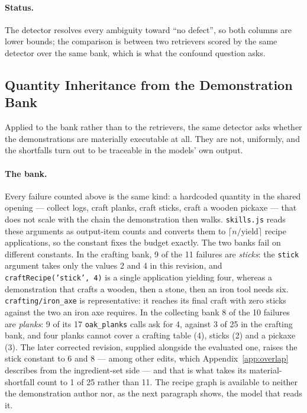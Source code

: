 \documentclass[letterpaper]{article} %
\newcommand{\appref}[1]{Appendix~\ref{#1}}
\begin{document}
\paragraph{Status.}  The detector resolves every
ambiguity toward ``no defect'', so both columns are lower bounds; the
comparison is between two retrievers scored by the same detector over
the same bank, which is what the confound question asks.

\subsection*{Quantity Inheritance from the Demonstration Bank}
\label{app:quantity}

Applied to the bank rather than to the retrievers, the same detector
asks whether the demonstrations are materially executable at all.  They
are not, uniformly, and the shortfalls turn out to be traceable in the
models' own output.

\paragraph{The bank.}  Every failure counted above is the same kind: a
hardcoded quantity in the shared opening --- collect logs, craft planks,
craft sticks, craft a wooden pickaxe --- that does not scale with the
chain the demonstration then walks.  \texttt{skills.js} reads these
arguments as output-item counts and converts them to
$\lceil n/\text{yield}\rceil$ recipe applications, so the constant fixes
the budget exactly.  The two banks fail on different constants.  In the
crafting bank, 9 of the 11 failures are \emph{sticks}: the
\texttt{stick} argument takes only the values 2 and 4 in this revision,
and \texttt{craftRecipe('stick', 4)} is a single application yielding
four, whereas a demonstration that crafts a wooden, then a stone, then
an iron tool needs six.  \texttt{crafting/iron\_axe} is representative:
it reaches its final craft with zero sticks against the two an iron axe
requires.  In the collecting bank 8 of the 10 failures are
\emph{planks}: 9 of its 17 \texttt{oak\_planks} calls ask for 4, against
3 of 25 in the crafting bank, and four planks cannot cover a crafting
table (4), sticks (2) and a pickaxe (3).  The later corrected revision,
supplied alongside the evaluated one, raises the stick constant to 6 and
8 --- among other edits, which \appref{app:overlap} describes from the
ingredient-set side --- and that is what takes its material-shortfall
count to 1 of 25 rather than 11.  The recipe graph is available to neither
the demonstration author nor, as the next paragraph shows, the model
that reads it.
\end{document}
